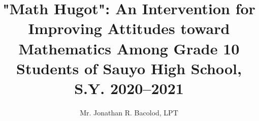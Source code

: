 

\author{Mr. Jonathan R. Bacolod, LPT} 

\title{"Math Hugot": An Intervention for Improving Attitudes toward Mathematics Among Grade 10 Students of Sauyo High School, S.Y. 2020--2021}